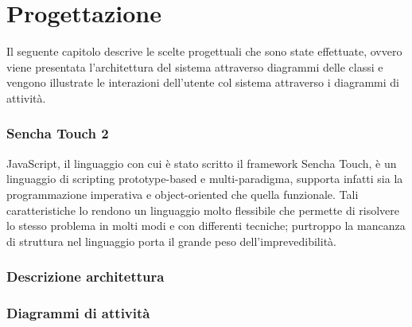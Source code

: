 \chapter{Progettazione}\label{ch:progettazione}
Il seguente capitolo descrive le scelte progettuali che sono state effettuate, ovvero viene presentata l'architettura del sistema attraverso diagrammi delle classi e vengono illustrate le interazioni dell'utente col sistema attraverso i diagrammi di attività.

\subsection{Sencha Touch 2}
JavaScript, il linguaggio con cui è stato scritto il framework Sencha Touch, è un linguaggio di scripting prototype-based e multi-paradigma, supporta infatti sia la programmazione imperativa e object-oriented che quella funzionale.
Tali caratteristiche lo rendono un linguaggio molto flessibile che permette di risolvere lo stesso problema in molti modi e con differenti tecniche; purtroppo la mancanza di struttura nel linguaggio porta il grande peso dell'imprevedibilità.


\subsection{Descrizione architettura}

\subsection{Diagrammi di attività}